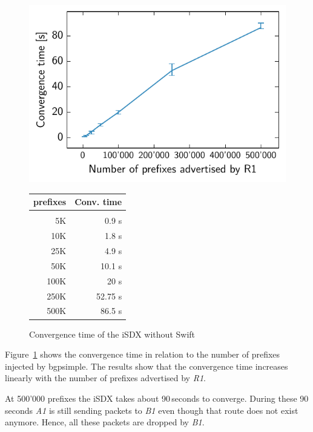 \begin{figure}
\centering
\begin{minipage}[t]{.4\textwidth}
\centering
\vspace{0pt}
\includegraphics[scale = 1]{Figures/noswift.pdf}
\end{minipage}\hfill
\begin{minipage}[t]{.4\textwidth}
\centering
\vspace{0pt}
\begin{tabular}{@{}rr@{}}
	\\
	prefixes & Conv. time \\
	\hline
	\\
    5K & 0.9 s  \\
    10K & 1.8 s   \\
    25K & 4.9 s   \\
    50K & 10.1 s  \\
    100K & 20 s \\
    250K & 52.75 s   \\
    500K & 86.5 s  \\
\end{tabular}
\end{minipage}
\caption{Convergence time of the iSDX without Swift}
\label{fig:noswift}
\end{figure}

Figure~\ref{fig:noswift} shows the convergence time in relation to the number of prefixes injected by bgpsimple. The results show that the convergence time increases linearly with the number of prefixes advertised by \emph{R1}.

At 500'000 prefixes the iSDX takes about 90\,seconds to converge. During these 90\,seconds \emph{A1} is still sending packets to \emph{B1} even though that route does not exist anymore. Hence, all these packets are dropped by \emph{B1}. 

